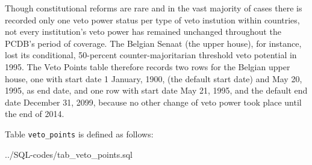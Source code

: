 Though constitutional reforms are rare and in the vast majority of cases there is recorded only one veto power status per type of veto instution within countries, not every institution's veto power has remained unchanged throughout the  PCDB's period of coverage. 
The Belgian Senaat (the upper house), for instance, lost its conditional, 50-percent counter-majoritarian threshold veto potential in 1995. 
The Veto Points table therefore records two rows for the Belgian upper house, one with start date 1 January, 1900, (the default start date) and May 20, 1995, as end date, and one row with start date May 21, 1995, and the default end date December 31, 2099, because no other change of veto power took place until the end of 2014.

Table \texttt{\footnotesize veto\_points} is defined as follows: 

%
{../SQL-codes/tab_veto_points.sql}


